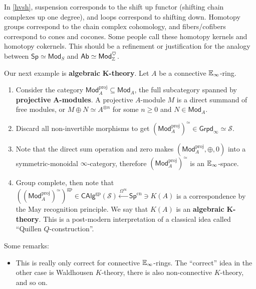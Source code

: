 \begin{example}
\begin{itemize}
In \cref{hvsh}, suspension corresponds to the shift up functor (shifting chain complexes up one degree), and loops correspond to shifting down. Homotopy groups correspond to the chain complex cohomology, and fibers/cofibers correspond to cones and cocones. Some people call these homotopy kernels and homotopy cokernels. This should be a refinement or justification for the analogy between $\mathsf{Sp} \simeq \mathsf{Mod} _S$ and $\mathsf{Ab} \simeq  \mathsf{Mod} _{\mathbb{Z}}^{\heartsuit}$.
\end{itemize}
    
\end{example}

\begin{example}
    Our next example is \textbf{algebraic} $\mathbf K$\textbf{-theory}. Let $A$ be a connective $\mathbb{E}_{\infty}$-ring. 
\begin{enumerate}[label=(\arabic*)]
\setlength\itemsep{-.2em}
    \item Consider the category $\mathsf{Mod} _A ^{\mathrm{proj}}\subseteq \mathsf{Mod} _A$, the full subcategory spanned by \textbf{projective} $\mathbf A$\textbf{-modules}. A projective $A$-module $M$ is a direct summand of free modules, or $M\oplus N \simeq  A^{\otimes n}$ for some $n\geq 0$ and $N \in \mathsf{Mod} _A$.
    \item Discard all non-invertible morphisms to get $(\mathsf{Mod} _A^{\mathrm{proj}}) ^{\simeq }\in \mathsf{Grpd} _{\infty}\simeq \mathcal{S} $.
    \item Note that the direct sum operation and zero makes $(\mathsf{Mod} _A^{\mathrm{proj}},\oplus, 0)$ into a symmetric-monoidal $\infty$-category, therefore $(\mathsf{Mod} _A^{\mathrm{proj}})^{\simeq }$ is an $\mathbb{E}_{\infty}$-space.
    \item Group complete, then note that $\left( (\mathsf{Mod} _A^{\mathrm{proj}})^{\simeq } \right) ^{\mathrm{gp}}\in \mathsf{CAlg} ^{\mathrm{gp}}(\mathcal{S} )\xleftarrow{\Omega^{\infty}} \mathsf{Sp} ^{\mathrm{cn}}\ni K(A)$ is a correspondence by the May recognition principle. We say that $K(A)$ is an \textbf{algebraic} $\mathbf K$\textbf{-theory}. This is a post-modern interpretation of a classical idea called ``Quillen $Q$-construction''.
\end{enumerate}
Some remarks:
\begin{itemize}
\setlength\itemsep{-.2em}
    \item This is really only correct for connective $\mathbb{E}_{\infty}$-rings. The ``correct'' idea in the other case is Waldhousen $K$-theory, there is also non-connective $K$-theory, and so on.

\end{itemize}
\end{example}
